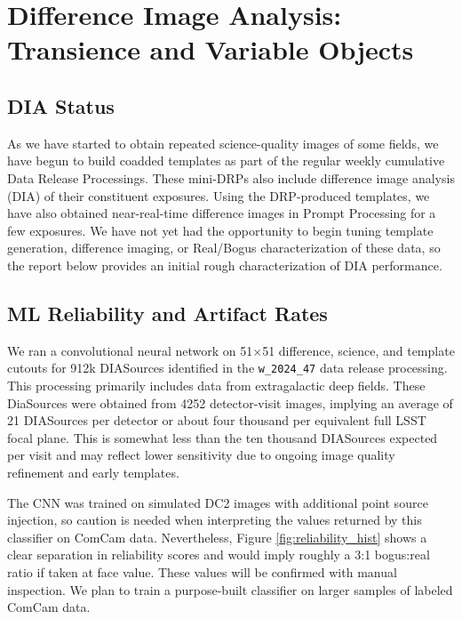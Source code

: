 \section{Difference Image Analysis: Transience and Variable Objects}
\label{sec:dia_transient_variable}


\subsection{DIA Status}

As we have started to obtain repeated science-quality images of some fields, we have begun to build coadded templates as part of the regular weekly cumulative Data Release Processings. 
These mini-DRPs also include difference image analysis (DIA) of their constituent exposures.
Using the DRP-produced templates, we have also obtained near-real-time difference images in Prompt Processing for a few exposures. 
We have not yet had the opportunity to begin tuning template generation, difference imaging, or Real/Bogus characterization of these data, so the report below provides an initial rough characterization of DIA performance. 

\subsection{ML Reliability and Artifact Rates}

We ran a convolutional neural network on 51$\times$51 difference, science, and template cutouts for 912k DIASources identified in the \texttt{w\_2024\_47} data release processing.  
This processing primarily includes data from extragalactic deep fields.
These DiaSources were obtained from 4252 detector-visit images, implying an average of 21 DIASources per detector or about four thousand per equivalent full LSST focal plane.
This is somewhat less than the ten thousand DIASources expected per visit and may reflect lower sensitivity due to ongoing image quality refinement and early templates.

The CNN was trained on simulated DC2 images with additional point source injection, so caution is needed when interpreting the values returned by this classifier on ComCam data.
Nevertheless,  Figure \ref{fig:reliability_hist} shows a clear separation in reliability scores and would imply roughly a 3:1 bogus:real ratio if taken at face value.
These values will be confirmed with manual inspection.
We plan to train a purpose-built classifier on larger samples of labeled ComCam data.

